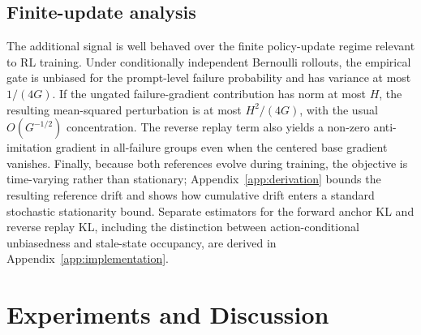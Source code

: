 \documentclass{article}
\begin{document}
\subsection{Finite-update analysis}
The additional signal is well behaved over the finite policy-update regime relevant to RL training. Under conditionally independent Bernoulli rollouts, the empirical gate is unbiased for the prompt-level failure probability and has variance at most $1/(4G)$. If the ungated failure-gradient contribution has norm at most $H$, the resulting mean-squared perturbation is at most $H^2/(4G)$, with the usual $O(G^{-1/2})$ concentration. The reverse replay term also yields a non-zero anti-imitation gradient in all-failure groups even when the centered base gradient vanishes. Finally, because both references evolve during training, the objective is time-varying rather than stationary; Appendix~\ref{app:derivation} bounds the resulting reference drift and shows how cumulative drift enters a standard stochastic stationarity bound. Separate estimators for the forward anchor KL and reverse replay KL, including the distinction between action-conditional unbiasedness and stale-state occupancy, are derived in Appendix~\ref{app:implementation}.

\section{Experiments and Discussion}
\label{sec:experiments}
\end{document}
